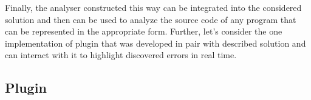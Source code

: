 Finally, the analyser constructed this way can be integrated into the considered solution and then can be used to analyze the source code of any program that can be represented in the appropriate form.
Further, let's consider the one implementation of plugin that was developed in pair with described solution and can interact with it to highlight discovered errors in real time.

\subsection{Plugin}

%
%
%
%
